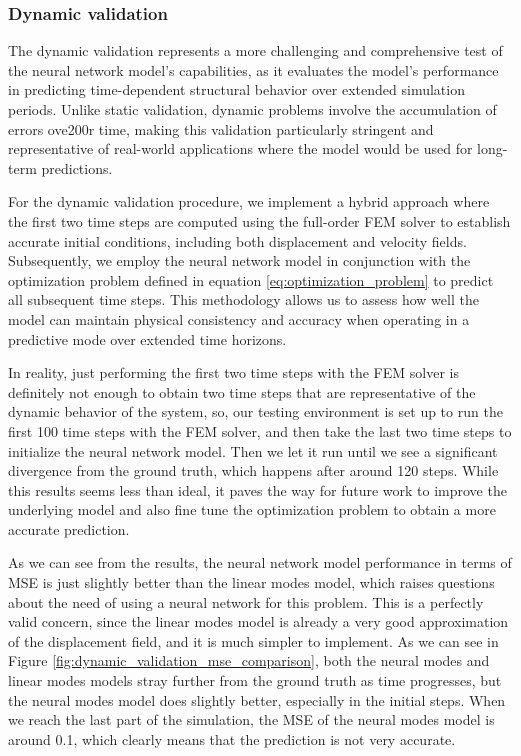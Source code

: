 \subsubsection{Dynamic validation}
\label{sec:dynamic_validation}
The dynamic validation represents a more challenging and comprehensive test of the neural network model's capabilities, as it evaluates the model's performance in predicting time-dependent structural behavior over extended simulation periods. Unlike static validation, dynamic problems involve the accumulation of errors ove200r time, making this validation particularly stringent and representative of real-world applications where the model would be used for long-term predictions.

For the dynamic validation procedure, we implement a hybrid approach where the first two time steps are computed using the full-order FEM solver to establish accurate initial conditions, including both displacement and velocity fields. Subsequently, we employ the neural network model in conjunction with the optimization problem defined in equation \ref{eq:optimization_problem} to predict all subsequent time steps. This methodology allows us to assess how well the model can maintain physical consistency and accuracy when operating in a predictive mode over extended time horizons.

In reality, just performing the first two time steps with the FEM solver is definitely not enough to obtain two time steps that are representative of the dynamic behavior of the system, so, our testing environment is set up to run the first 100 time steps with the FEM solver, and then take the last two time steps to initialize the neural network model. Then we let it run until we see a significant divergence from the ground truth, which happens after around 120 steps. While this results seems less than ideal, it paves the way for future work to improve the underlying model and also fine tune the optimization problem to obtain a more accurate prediction.

As we can see from the  results, the neural network model performance in terms of MSE is just slightly better than the linear modes model, which raises questions about the need of  using a neural network for this problem. This is a perfectly valid concern, since the linear modes model is already a very good approximation of the displacement field, and it is much simpler to implement. As we can see in Figure \ref{fig:dynamic_validation_mse_comparison}, both the neural modes and linear modes models stray further from the ground truth as time progresses, but the neural modes model does slightly better, especially in the initial steps. When we reach the last part of the simulation, the MSE of the neural modes model is around 0.1, which clearly means that the prediction is not very accurate.

